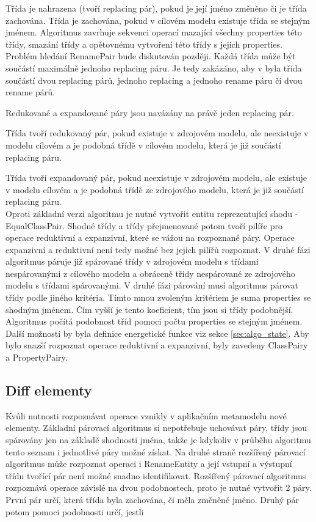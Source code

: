 \documentclass[11pt,twoside,a4paper]{book}
\begin{document}
 Třída je nahrazena (tvoří replacing pár), pokud je její jméno změněno či je
 třída zachována. Třída je zachována, pokud v cílovém modelu existuje třída se
 stejným jménem. Algoritmus zavrhuje sekvenci operací mazající všechny
 properties této třídy, smazání třídy a opětovnému vytvoření této třídy s
 jejich properties. Problém hledání RenamePair bude diskutován později. Každá
 třída může být součástí maximálně jednoho replacing páru. Je tedy zakázáno, aby
 v byla třída součástí dvou replacing párů, jednoho replacing a jednoho rename
 páru či dvou rename párů.
 
 Redukované a expandované páry jsou navázány na právě jeden replacing pár.
 
 Třída tvoří redukovaný pár, pokud existuje v zdrojovém modelu, ale neexistuje
 v modelu cílovém a je podobná třídě v cílovém modelu, která je již součástí
 replacing páru.
 
 Třída tvoří expandovaný pár, pokud neexistuje v zdrojovém modelu,
 ale existuje v modelu cílovém a je podobná třídě ze zdrojového modelu, která
 je již součástí replacing páru.\\
 
 Oproti základní verzi algoritmu je nutné vytvořit entitu reprezentující shodu -
 EqualClassPair. Shodné třídy a třídy přejmenované potom tvoří pilíře pro
 operace reduktivní a expanzivní, které se vážou na rozpoznané páry. Operace
 expanzivní a reduktivní není tedy možné bez jejich pilířů rozpoznat. V
 druhé fázi algoritmus páruje již spárované třídy v zdrojovém modelu s třídami
 nespárovanými z cílového modelu a obráceně třídy nespárované ze zdrojového
 modelu s třídami spárovanými. V druhé fázi párování musí algoritmus párovat
 třídy podle jiného kritéria.
 Tímto mnou zvoleným kritériem je suma properties se shodným jménem. Čím vyšší
 je tento koeficient, tím jsou si třídy podobnější.\\
 
 Algoritmus počítá podobnost tříd pomoci počtu properties se stejným jménem.
 Další možností by byla definice energetické funkce viz sekce
 \ref{sec:algo_state}. Aby bylo snazší rozpoznat operace reduktivní a
 expanzivní, byly zavedeny ClassPairy a PropertyPairy.
 
\subsection{Diff elementy}\label{subsect:Diff elementy}
 
 Kvůli nutnosti rozpoznávat operace vznikly v aplikačním metamodelu nové
 elementy. Základní párovací algoritmus si nepotřebuje uchovávat páry,
 třídy jsou spárovány jen na základě shodnosti jména, takže je kdykoliv
 v průběhu algoritmu tento seznam i jednotlivé páry možné získat. Na druhé
 straně rozšířený párovací algoritmus může rozpoznat operaci i RenameEntity a
 její vstupní a výstupní třídu tvořící pár není možné snadno identifikovat.
 Rozšířený párovací algoritmus rozpoznává operace závislé na dvou podobnostech,
 proto je nutné vytvořit 2 páry. První pár určí, která třída byla zachována, či
 měla změněné jméno. Druhý pár potom pomoci podobnosti určí, jestli 
 
\end{document}
